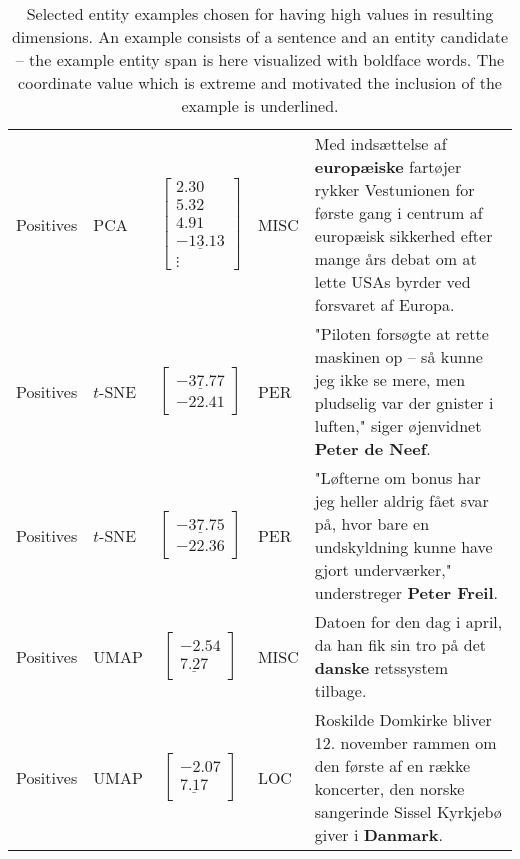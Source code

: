 \documentclass[main.tex]{subfiles}
\begin{document}
\begin{table}[H]
\begin{tabularx}{\linewidth}{llclX}
        Positives    & PCA       & $\begin{bmatrix}2.30\\5.32\\4.91\\\underline{-13.13}\\\vdots\end{bmatrix}$ & MISC        & Med indsættelse af \textbf{europæiske} fartøjer rykker Vestunionen for første gang i centrum af europæisk sikkerhed efter mange års debat om at lette USAs byrder ved forsvaret af Europa.\\

        Positives    & $t$-SNE       & $\begin{bmatrix}\underline{-37.77}\\-22.41\end{bmatrix}$ & PER        & "Piloten forsøgte at rette maskinen op -- så kunne jeg ikke se mere, men pludselig var der gnister i luften," siger øjenvidnet \textbf{Peter de Neef}.\\

        Positives    & $t$-SNE       & $\begin{bmatrix}\underline{-37.75}\\-22.36\end{bmatrix}$ & PER        & "Løfterne om bonus har jeg heller aldrig fået svar på, hvor bare en undskyldning kunne have gjort underværker," understreger \textbf{Peter Freil}.\\

        Positives    & UMAP       & $\begin{bmatrix}-2.54\\\underline{7.27}\end{bmatrix}$ & MISC       & Datoen for den dag i april, da han fik sin tro på det \textbf{danske} retssystem tilbage.\\

        Positives    & UMAP       & $\begin{bmatrix}-2.07\\\underline{7.17}\end{bmatrix}$ & LOC        & Roskilde Domkirke bliver 12. november rammen om den første af en række koncerter, den norske sangerinde Sissel Kyrkjebø giver i \textbf{Danmark}.

\end{tabularx}
    \caption{
        \footnotesize
        Selected entity examples chosen for having high values in resulting dimensions.
        An example consists of a sentence and an entity candidate -- the example entity span is here visualized with boldface words.
        The coordinate value which is extreme and motivated the inclusion of the example is underlined.
    }
    \label{tab:dimexamples}
\end{table}\noindent
\end{document}
